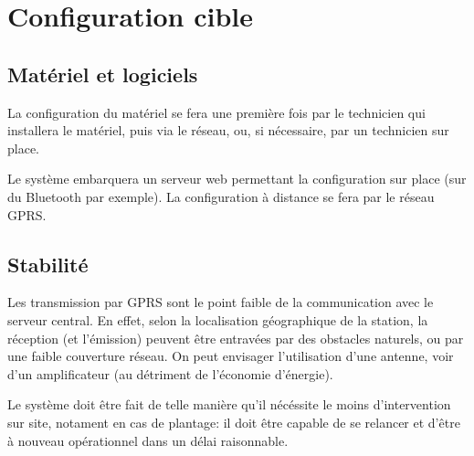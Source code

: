 
\section{Configuration cible}

    \subsection{Matériel et logiciels}
        La configuration du matériel se fera une première fois
        par le technicien qui installera le matériel, puis via le
        réseau, ou, si nécessaire, par un technicien sur place.
        
        Le système embarquera un serveur web permettant la configuration
        sur place (sur du Bluetooth par exemple). La configuration à 
        distance se fera par le réseau GPRS. 

    \subsection{Stabilité}
        Les transmission par GPRS sont le point faible de la
        communication avec le serveur central. En effet, selon la
        localisation géographique de la station, la réception (et
        l'émission) peuvent être entravées par des obstacles naturels,
        ou par une faible couverture réseau. On peut envisager
        l'utilisation d'une antenne, voir d'un amplificateur (au
        détriment de l'économie d'énergie).

        Le système doit être fait de telle manière qu'il nécéssite le
        moins d'intervention sur site, notament en cas de plantage:
        il doit être capable de se relancer et d'être à nouveau
        opérationnel dans un délai raisonnable.
